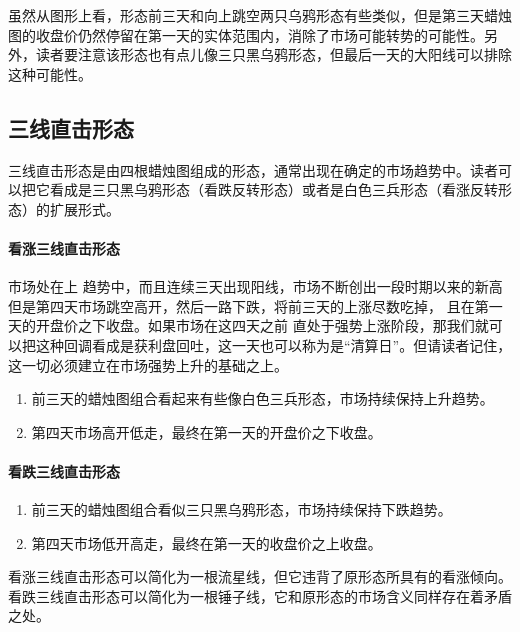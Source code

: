 虽然从图形上看，形态前三天和向上跳空两只乌鸦形态有些类似，但是第三天蜡烛图的收盘价仍然停留在第一天的实体范围内，消除了市场可能转势的可能性。另外，读者要注意该形态也有点儿像三只黑乌鸦形态，但最后一天的大阳线可以排除这种可能性。

\subsection{三线直击形态}
三线直击形态是由四根蜡烛图组成的形态，通常出现在确定的市场趋势中。读者可以把它看成是三只黑乌鸦形态（看跌反转形态）或者是白色三兵形态（看涨反转形态）的扩展形式。

\paragraph{看涨三线直击形态} 市场处在上 趋势中，而且连续三天出现阳线，市场不断创出一段时期以来的新高 但是第四天市场跳空高开，然后一路下跌，将前三天的上涨尽数吃掉， 且在第一天的开盘价之下收盘。如果市场在这四天之前 直处于强势上涨阶段，那我们就可以把这种回调看成是获利盘回吐，这一天也可以称为是“清算日”。但请读者记住，这一切必须建立在市场强势上升的基础之上。
\begin{enumerate}
    \item 前三天的蜡烛图组合看起来有些像白色三兵形态，市场持续保持上升趋势。
    \item 第四天市场高开低走，最终在第一天的开盘价之下收盘。
\end{enumerate}


\paragraph{看跌三线直击形态}
\begin{enumerate}
    \item 前三天的蜡烛图组合看似三只黑乌鸦形态，市场持续保持下跌趋势。
    \item 第四天市场低开高走，最终在第一天的收盘价之上收盘。
\end{enumerate}

看涨三线直击形态可以简化为一根流星线，但它违背了原形态所具有的看涨倾向。看跌三线直击形态可以简化为一根锤子线，它和原形态的市场含义同样存在着矛盾之处。